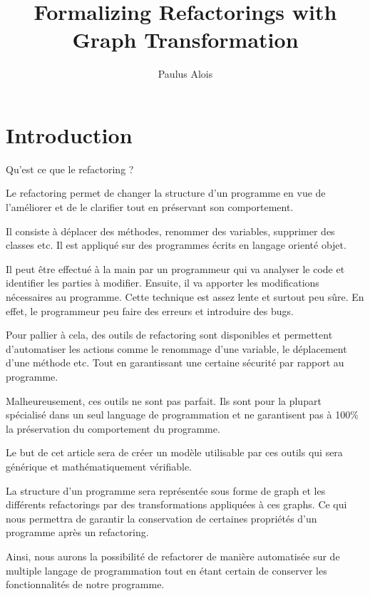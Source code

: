 \documentclass[a4paper, 12pt]{article}
\title{Formalizing Refactorings with Graph Transformation}
\author{Paulus Alois}
\begin{document}
  \maketitle

  \tableofcontents

  \newpage

  \section{Introduction}

  Qu'est ce que le refactoring ?

  Le refactoring permet de changer la structure d'un programme en vue de l'améliorer et de le clarifier tout en préservant son comportement.

  Il consiste à déplacer des méthodes, renommer des variables, supprimer des classes etc. Il est appliqué sur des programmes écrits en langage orienté objet.

  Il peut être effectué à la main par un programmeur qui va analyser le code et identifier les parties à modifier. Ensuite, il va apporter les modifications nécessaires au programme.
  Cette technique est assez lente et surtout peu sûre. En effet, le programmeur peu faire des erreurs et introduire des bugs.

  Pour pallier à cela, des outils de refactoring sont disponibles et permettent d'automatiser les actions comme le renommage d'une variable, le déplacement d'une méthode etc.
  Tout en garantissant une certaine sécurité par rapport au programme.

  Malheureusement, ces outils ne sont pas parfait. Ils sont pour la plupart spécialisé dans un seul language de programmation et ne garantisent pas à 100\% la préservation du comportement du programme.

  Le but de cet article sera de créer un modèle utilisable par ces outils qui sera générique et mathématiquement vérifiable.

  La structure d'un programme sera représentée sous forme de graph et les différents refactorings par des transformations appliquées à ces graphs.
  Ce qui nous permettra de garantir la conservation de certaines propriétés d'un programme après un refactoring.

  Ainsi, nous aurons la possibilité de refactorer de manière automatisée sur de multiple langage de programmation tout en étant certain de conserver les fonctionnalités de notre programme.

  \newpage
\end{document}
